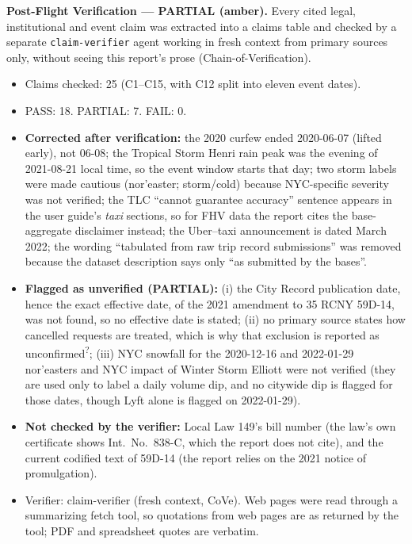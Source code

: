 \noindent\textbf{Post-Flight Verification --- PARTIAL (amber).}
Every cited legal, institutional and event claim was extracted into a claims table and checked by a separate
\texttt{claim-verifier} agent working in fresh context from primary sources only, without seeing this report's prose
(Chain-of-Verification).

\begin{itemize}
  \item Claims checked: 25 (C1--C15, with C12 split into eleven event dates).
  \item PASS: 18. PARTIAL: 7. FAIL: 0.
  \item \textbf{Corrected after verification:}
  the 2020 curfew ended 2020-06-07 (lifted early), not 06-08; the Tropical Storm Henri rain peak was the evening of
  2021-08-21 local time, so the event window starts that day; two storm labels were made cautious (nor'easter; storm/cold)
  because NYC-specific severity was not verified; the TLC ``cannot guarantee accuracy'' sentence appears in the user guide's
  \emph{taxi} sections, so for FHV data the report cites the base-aggregate disclaimer instead; the Uber--taxi
  announcement is dated March 2022; the wording ``tabulated from raw trip record submissions'' was removed because the
  dataset description says only ``as submitted by the bases''.
  \item \textbf{Flagged as unverified (PARTIAL):}
  (i) the City Record publication date, hence the exact effective date, of the 2021 amendment to 35 RCNY 59D-14, was not found,
  so no effective date is stated; (ii) no primary source states how cancelled requests are treated, which is why that
  exclusion is reported as unconfirmed\textsuperscript{?}; (iii) NYC snowfall for the 2020-12-16 and 2022-01-29 nor'easters and
  NYC impact of Winter Storm Elliott were not verified (they are used only to label a daily volume dip, and no citywide dip is flagged for those dates, though Lyft alone is flagged on 2022-01-29).
  \item \textbf{Not checked by the verifier:} Local Law 149's bill number (the law's own certificate shows Int.\ No.\ 838-C,
  which the report does not cite), and the current codified text of 59D-14 (the report relies on the 2021 notice of promulgation).
  \item Verifier: claim-verifier (fresh context, CoVe). Web pages were read through a summarizing fetch tool, so quotations
  from web pages are as returned by the tool; PDF and spreadsheet quotes are verbatim.
\end{itemize}
